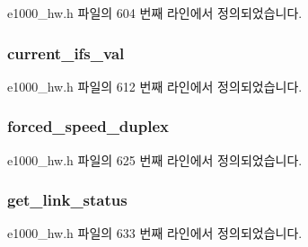 e1000\+\_\+hw.\+h 파일의 604 번째 라인에서 정의되었습니다.

\subsubsection[{\texorpdfstring{current\+\_\+ifs\+\_\+val}{current_ifs_val}}]{ current\+\_\+ifs\+\_\+val}\hypertarget{structe1000__mac__info_af4a065dd20e0c354cf36441f3578f0b3}{}\label{structe1000__mac__info_af4a065dd20e0c354cf36441f3578f0b3}


e1000\+\_\+hw.\+h 파일의 612 번째 라인에서 정의되었습니다.

\subsubsection[{\texorpdfstring{forced\+\_\+speed\+\_\+duplex}{forced_speed_duplex}}]{ forced\+\_\+speed\+\_\+duplex}\hypertarget{structe1000__mac__info_afe7d7ee7b0b71545fecfd40ea86cfa5e}{}\label{structe1000__mac__info_afe7d7ee7b0b71545fecfd40ea86cfa5e}


e1000\+\_\+hw.\+h 파일의 625 번째 라인에서 정의되었습니다.

\subsubsection[{\texorpdfstring{get\+\_\+link\+\_\+status}{get_link_status}}]{ get\+\_\+link\+\_\+status}\hypertarget{structe1000__mac__info_aa7d2ab66f2a3ad9607f0edbfd81d1a17}{}\label{structe1000__mac__info_aa7d2ab66f2a3ad9607f0edbfd81d1a17}


e1000\+\_\+hw.\+h 파일의 633 번째 라인에서 정의되었습니다.

